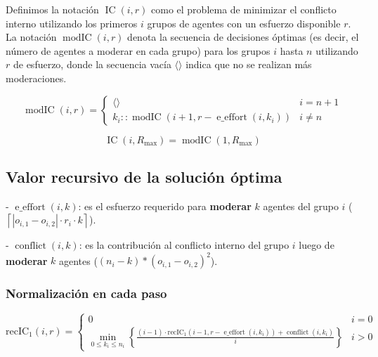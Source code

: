 Definimos la notación $\operatorname{ IC }(i,r)$ como el problema de minimizar el conflicto interno utilizando los primeros $i$ grupos de agentes con un esfuerzo disponible $r$. La notación $\operatorname{ modIC }(i,r)$ denota la secuencia de decisiones óptimas (es decir, el número de agentes a moderar en cada grupo) para los grupos $i$ hasta $n$ utilizando $r$ de esfuerzo, donde la secuencia vacía $\langle \rangle$ indica que no se realizan más moderaciones.

\begin{equation}
	\operatorname{ modIC }(i,r) = \begin{cases}
		\langle \rangle                                                             & i = n + 1 \\
		k_i :: \operatorname{ modIC }(i + 1,r - \operatorname{ e\_effort }(i,k_i))  & i \neq n
	\end{cases}
\end{equation}

\begin{equation}
	\operatorname{ IC }(i,R_{ \max }) = \operatorname{ modIC }(1,R_{ \max })
\end{equation}

\subsection{Valor recursivo de la solución óptima}

- $\operatorname{ e\_effort }(i,k)$: es el esfuerzo requerido para \textbf{moderar} $k$ agentes del grupo $i$ ($\left \lceil |o_{ i,1 } - o_{ i,2 }| \cdot r_i \cdot k \right \rceil$).

- $\operatorname{ conflict }(i,k)$: es la contribución al conflicto interno del grupo $i$ luego de \textbf{moderar} $k$ agentes ($(n_i - k) * (o_{ i,1 } - o_{ i,2 })^2$).

\subsubsection{Normalización en cada paso}

\begin{equation}
	\operatorname{ { recIC }_1 }(i,r) = \begin{cases}
		0                                                                                                                                                                                        & i = 0 \\
		\min_{ 0 \leq k_i \leq n_i } \left \{ \frac{ (i - 1) \cdot \operatorname{ { recIC }_1 }(i - 1,r - \operatorname{ e\_effort }(i,k_i)) + \operatorname{ conflict }(i,k_i) }{ i } \right \} & i > 0
	\end{cases}
\end{equation}

